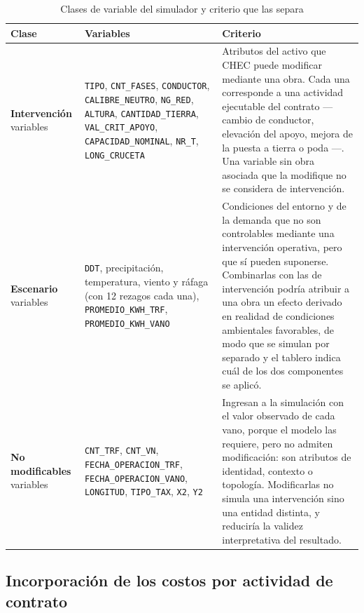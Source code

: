 \documentclass[11pt,a4paper]{article}
\begin{document}
\begin{table}[H]
\centering
\caption{Clases de variable del simulador y criterio que las separa}
\label{tab:clasesvariable}
\footnotesize
\begin{tabularx}{\textwidth}{L{2.6cm} L{5.2cm} X}
\toprule
\textbf{Clase} & \textbf{Variables} & \textbf{Criterio} \\
\midrule
\textbf{Intervención} variables &
\texttt{TIPO}, \texttt{CNT\_FASES}, \texttt{CONDUCTOR}, \texttt{CALIBRE\_NEUTRO},
\texttt{NG\_RED}, \texttt{ALTURA}, \texttt{CANTIDAD\_TIERRA}, \texttt{VAL\_CRIT\_APOYO},
\texttt{CAPACIDAD\_NOMINAL}, \texttt{NR\_T}, \texttt{LONG\_CRUCETA} &
Atributos del activo que CHEC puede modificar mediante una obra. Cada una corresponde a una
actividad ejecutable del contrato --- cambio de conductor, elevación del apoyo, mejora de la
puesta a tierra o poda ---. Una variable sin obra asociada que la modifique no se considera de
intervención. \\
\addlinespace
\textbf{Escenario} variables &
\texttt{DDT}, precipitación, temperatura, viento y ráfaga (con 12 rezagos cada una),
\texttt{PROMEDIO\_KWH\_TRF}, \texttt{PROMEDIO\_KWH\_VANO} &
Condiciones del entorno y de la demanda que no son controlables mediante una intervención
operativa, pero que sí pueden suponerse. Combinarlas con las de intervención podría atribuir a
una obra un efecto derivado en realidad de condiciones ambientales favorables, de modo que se
simulan por separado y el tablero indica cuál de los dos componentes se aplicó. \\
\addlinespace
\textbf{No modificables} variables &
\texttt{CNT\_TRF}, \texttt{CNT\_VN}, \texttt{FECHA\_OPERACION\_TRF},
\texttt{FECHA\_OPERACION\_VANO}, \texttt{LONGITUD}, \texttt{TIPO\_TAX}, \texttt{X2},
\texttt{Y2} &
Ingresan a la simulación con el valor observado de cada vano, porque el modelo las requiere,
pero no admiten modificación: son atributos de identidad, contexto o topología. Modificarlas no
simula una intervención sino una entidad distinta, y reduciría la validez interpretativa del
resultado. \\
\bottomrule
\end{tabularx}
\end{table}

\subsection{Incorporación de los costos por actividad de contrato}
\label{sec:costos}
\end{document}
